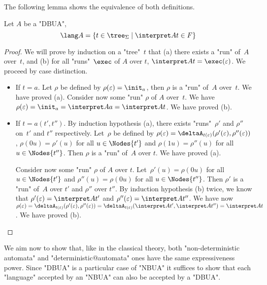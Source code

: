 \documentclass[a4paper,UKenglish,cleveref, autoref, thm-restate]{lipics-v2021}
\begin{document}
The following lemma shows the equivalence of both definitions.

\begin{lemma}
	Let $A$ be a "DBUA",
	\[ \lang A = \setdef {t \in \tree_{\Sigma}} {\interpret A t \in F} \]
\end{lemma}

\begin{proof}
	We will prove by induction on a "tree"~$t$ that (a) there exists a "run" of~$A$ over~$t$, and (b) for all "runs"~$\exec$ of $A$ over $t$, $\interpret A t = \exec (\varepsilon)$.
	We proceed by case distinction.
	\begin{itemize}
		\item If $t = a$. Let $\rho$ be defined by $\rho(\varepsilon)=\init_a$, then $\rho$ is a "run" of~$A$ over~$t$. We have proved (a).
		      Consider now some "run" $\rho$ of $A$ over~$t$. We have $\rho(\varepsilon)=\init_a=\interpret A a=\interpret A t$. We have proved  (b).

		\item If $t = a(t',t'')$. By induction hypothesis (a), there exists "runs"~$\rho'$ and $\rho''$ on~$t'$ and $t''$ respectively.
		      Let~$\rho$ be defined by $\rho(\varepsilon)=\deltaA_{t(\varepsilon)}(\rho'(\varepsilon),\rho''(\varepsilon))$,
		      $\rho(0u)=\rho'(u)$ for all $u\in\Nodes{t'}$ and $\rho(1u)=\rho''(u)$ for all~$u\in \Nodes{t''}$. Then $\rho$ is a "run" of~$A$ over $t$. We have proved (a).

		      Consider now some "run" $\rho$ of $A$ over $t$. Let~$\rho'(u)=\rho(0u)$ for all $u \in \Nodes {t'}$ and $\rho''(u)=\rho(0u)$ for all $u \in \Nodes {t''}$.
		      Then $\rho'$ is a "run" of~$A$ over $t'$ and $\rho''$ over $t''$. By induction hypothesis (b) twice, we know that $\rho'(\varepsilon)=\interpret A {t'}$ and $\rho''(\varepsilon)=\interpret A {t''}$.
		      We have now $\rho(\varepsilon) = \deltaA_{t(\varepsilon)}(\rho'(\varepsilon),\rho''(\varepsilon)) = \deltaA_{t(\varepsilon)}(\interpret A {t'},\interpret A {t''}) = \interpret A t$. We have proved (b).
	\end{itemize}
\end{proof}


We aim now to show that, like in the classical theory, both "non-deterministic automata" and "deterministic@automata" ones have the same expressiveness power.
Since "DBUA" is a particular case of "NBUA" it suffices to show that each "language" accepted by an "NBUA" can also be accepted by a "DBUA".
\end{document}
